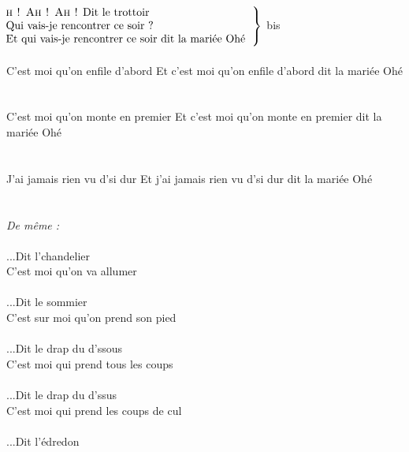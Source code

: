 \\
~\\
$\left.\begin{tabular}{l}
\hspace{-0.4cm}
\textsc{h ! Ah ! Ah !} Dit le trottoir         
\\
\hspace{-0.4cm}
Qui vais-je rencontrer ce soir ?    
\\
\hspace{-0.4cm}
Et qui vais-je rencontrer ce soir dit la mariée Ohé
\end{tabular}\right\rbrace$ bis
\\~\\
{C'est moi qu'on enfile d'abord}
{Et c'est moi qu'on enfile d'abord dit la mariée Ohé}
\\\\~\\
{C'est moi qu'on monte en premier}
{Et c'est moi qu'on monte en premier dit la mariée Ohé}
\\\\~\\
{J'ai jamais rien vu d'si dur}
{Et j'ai jamais rien vu d'si dur dit la mariée Ohé}
\\\\~\\
\textit{De même :}
\\\\...Dit l'chandelier
\\C'est moi qu'on va allumer
\\\\...Dit le sommier
\\C'est sur moi qu'on prend son pied
\\\\...Dit le drap du d'ssous
\\C'est moi qui prend tous les coups
\\\\...Dit le drap du d'ssus
\\C'est moi qui prend les coups de cul
\\\\...Dit l'édredon
